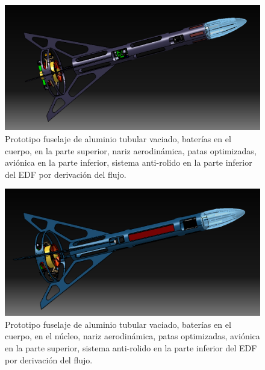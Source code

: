 \begin{figure}[htb]
    \centering
    \includegraphics[width=\linewidth]{fig/design/4}
    \caption{Prototipo fuselaje de aluminio tubular vaciado, baterías en el cuerpo, en la parte superior, nariz
    aerodinámica, patas optimizadas, aviónica en la parte inferior, sistema anti-rolido en la parte
    inferior del EDF por derivación del flujo.}
    \label{fig:design/4}
\end{figure}


\begin{figure}[htb]
    \centering
    \includegraphics[width=\linewidth]{fig/design/5}
    \caption{Prototipo fuselaje de aluminio tubular vaciado, baterías en el cuerpo, en el núcleo, nariz aerodinámica, patas optimizadas, aviónica en la parte superior, sistema anti-rolido en la parte
    inferior del EDF por derivación del flujo.}
    \label{fig:design/5}
\end{figure}

\null\newpage
\clearpage
